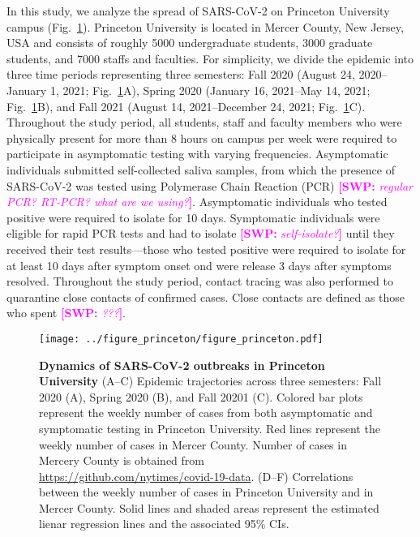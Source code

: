 \documentclass[12pt]{article}
\newcommand{\fref}[1]{Fig.~\ref{fig:#1}}
\newcommand{\comment}[3]{\textcolor{#1}{\textbf{[#2: }\textsl{#3}\textbf{]}}}
\newcommand{\swp}[1]{\comment{magenta}{SWP}{#1}}
\begin{document}
In this study, we analyze the spread of SARS-CoV-2 on Princeton University campus (\fref{princeton}).
Princeton University is located in Mercer County, New Jersey, USA and consists of roughly 5000 undergraduate students, 3000 graduate students, and 7000 staffs and faculties.
For simplicity, we divide the epidemic into three time periods representing three semesters: Fall 2020 (August 24, 2020--January 1, 2021; \fref{princeton}A), Spring 2020 (January 16, 2021--May 14, 2021; \fref{princeton}B), and Fall 2021 (August 14, 2021--December 24, 2021; \fref{princeton}C).
Throughout the study period, all students, staff and faculty members who were physically present for more than 8 hours on campus per week were required to participate in asymptomatic testing with varying frequencies.
Asymptomatic individuals submitted self-collected saliva samples, from which the presence of SARS-CoV-2 was tested using Polymerase Chain Reaction (PCR) \swp{regular PCR? RT-PCR? what are we using?}.  
Asymptomatic individuals who tested positive were required to isolate for 10 days.
Symptomatic individuals were eligible for rapid PCR tests and had to isolate \swp{self-isolate?} until they received their test results---those who tested positive were required to isolate for at least 10 days after symptom onset ond were release 3 days after symptoms resolved.
Throughout the study period, contact tracing was also performed to quarantine close contacts of confirmed cases.
Close contacts are defined as those who spent \swp{???}.


\begin{figure}[!th]
\texttt{[image: ../figure\_princeton/figure\_princeton.pdf]}
\caption{
\textbf{Dynamics of SARS-CoV-2 outbreaks in Princeton University}
(A--C) Epidemic trajectories across three semesters: Fall 2020 (A), Spring 2020 (B), and Fall 20201 (C).
Colored bar plots represent the weekly number of cases from both asymptomatic and symptomatic testing in Princeton University.
Red lines represent the weekly number of cases in Mercer County.
Number of cases in Mercery County is obtained from \url{https://github.com/nytimes/covid-19-data}.
(D--F) Correlations between the weekly number of cases in Princeton University and in Mercer County.
Solid lines and shaded areas represent the estimated lienar regression lines and the associated 95\% CIs.
\label{fig:princeton}
}
\end{figure}
\end{document}
